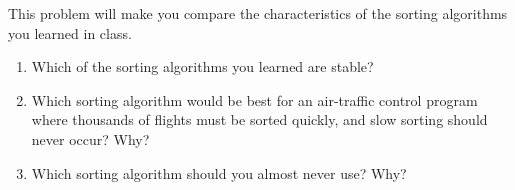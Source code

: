 This problem will make you compare the characteristics of the sorting
algorithms you learned in class.

\begin{enumerate}

\item  Which of the sorting algorithms you learned are stable?

\item  Which sorting algorithm would be best for an air-traffic control
program where thousands of flights must be sorted quickly, and
slow sorting should never occur?  Why?

\item  Which sorting algorithm should you almost never use?  Why?

\end{enumerate}
